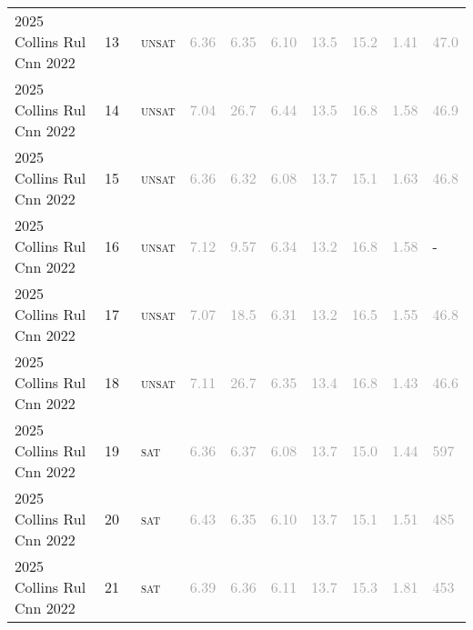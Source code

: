 \begin{center}
{\begin{longtable}{@{}llllllllll@{}}
2025 Collins Rul Cnn 2022 & 13 & ~\textsc{unsat} & \textcolor{darkgray}{6.36} & \textcolor{darkgray}{6.35} & \textcolor{darkgray}{6.10} & \textcolor{darkgray}{13.5} & \textcolor{darkgray}{15.2} & \textcolor{darkgray}{1.41} & \textcolor{darkgray}{47.0} \\
2025 Collins Rul Cnn 2022 & 14 & ~\textsc{unsat} & \textcolor{darkgray}{7.04} & \textcolor{darkgray}{26.7} & \textcolor{darkgray}{6.44} & \textcolor{darkgray}{13.5} & \textcolor{darkgray}{16.8} & \textcolor{darkgray}{1.58} & \textcolor{darkgray}{46.9} \\
2025 Collins Rul Cnn 2022 & 15 & ~\textsc{unsat} & \textcolor{darkgray}{6.36} & \textcolor{darkgray}{6.32} & \textcolor{darkgray}{6.08} & \textcolor{darkgray}{13.7} & \textcolor{darkgray}{15.1} & \textcolor{darkgray}{1.63} & \textcolor{darkgray}{46.8} \\
2025 Collins Rul Cnn 2022 & 16 & ~\textsc{unsat} & \textcolor{darkgray}{7.12} & \textcolor{darkgray}{9.57} & \textcolor{darkgray}{6.34} & \textcolor{darkgray}{13.2} & \textcolor{darkgray}{16.8} & \textcolor{darkgray}{1.58} & - \\
2025 Collins Rul Cnn 2022 & 17 & ~\textsc{unsat} & \textcolor{darkgray}{7.07} & \textcolor{darkgray}{18.5} & \textcolor{darkgray}{6.31} & \textcolor{darkgray}{13.2} & \textcolor{darkgray}{16.5} & \textcolor{darkgray}{1.55} & \textcolor{darkgray}{46.8} \\
2025 Collins Rul Cnn 2022 & 18 & ~\textsc{unsat} & \textcolor{darkgray}{7.11} & \textcolor{darkgray}{26.7} & \textcolor{darkgray}{6.35} & \textcolor{darkgray}{13.4} & \textcolor{darkgray}{16.8} & \textcolor{darkgray}{1.43} & \textcolor{darkgray}{46.6} \\
2025 Collins Rul Cnn 2022 & 19 & ~\textsc{sat} & \textcolor{darkgray}{6.36} & \textcolor{darkgray}{6.37} & \textcolor{darkgray}{6.08} & \textcolor{darkgray}{13.7} & \textcolor{darkgray}{15.0} & \textcolor{darkgray}{1.44} & \textcolor{darkgray}{597} \\
2025 Collins Rul Cnn 2022 & 20 & ~\textsc{sat} & \textcolor{darkgray}{6.43} & \textcolor{darkgray}{6.35} & \textcolor{darkgray}{6.10} & \textcolor{darkgray}{13.7} & \textcolor{darkgray}{15.1} & \textcolor{darkgray}{1.51} & \textcolor{darkgray}{485} \\
2025 Collins Rul Cnn 2022 & 21 & ~\textsc{sat} & \textcolor{darkgray}{6.39} & \textcolor{darkgray}{6.36} & \textcolor{darkgray}{6.11} & \textcolor{darkgray}{13.7} & \textcolor{darkgray}{15.3} & \textcolor{darkgray}{1.81} & \textcolor{darkgray}{453} \\

\end{longtable}}
\end{center}
